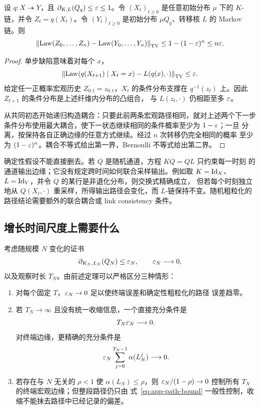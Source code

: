\begin{theorem}[宏观路径耦合]
\label{thm:app-path-coupling}
设 $q:X\twoheadrightarrow Y$，且
$\partial_{K,L}(Q_q)\le\varepsilon\le1$。令 $(X_t)_{t\ge0}$ 是任意初始分布
$\mu$ 下的 $K$-链，并令 $Z_t=q(X_t)$。令 $(Y_t)_{t\ge0}$ 是初始分布
$\mu Q_q$、转移核 $L$ 的 Markov 链。则
\begin{equation}
 \left\|
 \operatorname{Law}(Z_0,\ldots,Z_n)
 -\operatorname{Law}(Y_0,\ldots,Y_n)
 \right\|_{\operatorname{TV}}
 \le1-(1-\varepsilon)^n
 \le n\varepsilon.
 \label{eq:app-path-bound}
\end{equation}
\end{theorem}

\begin{proof}
单步缺陷意味着对每个 $x$，
\[
 \left\|
 \operatorname{Law}(q(X_{t+1})\mid X_t=x)
 -L(q(x),\cdot)
 \right\|_{\operatorname{TV}}\le\varepsilon.
\]
给定任一正概率宏观历史 $Z_{0:t}=z_{0:t}$，$X_t$ 的条件分布支撑在
$q^{-1}(z_t)$ 上。因此 $Z_{t+1}$ 的条件分布是上述纤维内分布的凸组合，
与 $L(z_t,\cdot)$ 仍相距至多 $\varepsilon$。

从共同初态开始递归构造耦合：只要此前两条宏观路径相同，就对上述两个下一步
条件分布使用最大耦合，使下一状态继续相同的条件概率至少为 $1-\varepsilon$；一旦
分离，按保持各自正确边缘的任意方式继续。经过 $n$ 次转移仍完全相同的概率
至少为 $(1-\varepsilon)^n$。耦合不等式给出第一界，Bernoulli 不等式给出第二界。
\end{proof}

确定性假设不能直接删去。若 $Q$ 是随机通道，方程 $KQ=QL$ 只约束每一时刻
的通道输出边缘；它没有规定跨时间如何联合采样输出。例如取
$K=\operatorname{Id}_X$、$L=\operatorname{Id}_Y$，并令 $Q$ 的某行是非退化分布，则交换式精确成立，
但若每个时刻独立地从 $Q(X_t,\cdot)$ 重采样，所得输出路径会变化，而
$L$-链保持不变。随机粗粒化的路径结论需要额外的联合耦合或 link consistency
条件。

\subsection{增长时间尺度上需要什么}

考虑随规模 $N$ 变化的证书
\[
 \partial_{K_N,L_N}(Q_N)\le\varepsilon_N,
 \qquad \varepsilon_N\longrightarrow0,
\]
以及观察时长 $T_N$。由前述定理可以严格区分三种情形：
\begin{enumerate}
 \item 对每个固定 $T$，$\varepsilon_N\to0$ 足以使终端误差和确定性粗粒化的路径
  误差趋零。
 \item 若 $T_N\to\infty$ 且没有统一收缩信息，一个直接充分条件是
 \begin{equation}
   T_N\varepsilon_N\longrightarrow0.
   \label{eq:app-growing-horizon-linear}
 \end{equation}
 对终端边缘，更精确的充分条件是
 \begin{equation}
   \varepsilon_N\sum_{j=0}^{T_N-1}\alpha(L_N^j)\longrightarrow0.
   \label{eq:app-growing-horizon-alpha}
 \end{equation}
 \item 若存在与 $N$ 无关的 $\rho<1$ 使 $\alpha(L_N)\le\rho$，则
 $\varepsilon_N/(1-\rho)\to0$ 控制所有 $T_N$ 的终端宏观边缘；但整段路径仍只由
 式~\eqref{eq:app-path-bound} 一般性控制，收缩不能抹去路径中已经记录的偏差。
\end{enumerate}

